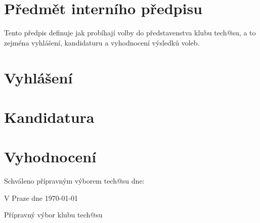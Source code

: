 \documentclass[10pt]{article}
\begin{document}
\section{Předmět interního předpisu}
	Tento předpis definuje jak probíhají volby do představenstva klubu tech@su, a to zejména vyhlášení, kandidaturu a vyhodnocení výsledků voleb.

\section{Vyhlášení}
	
\section{Kandidatura}

\section{Vyhodnocení}

\vspace{10mm}

Schváleno přípravným výborem tech@su dne:

\vspace{30mm}

\hfill V Praze dne \today

\hfill Přípravný výbor klubu tech@su
\end{document}
